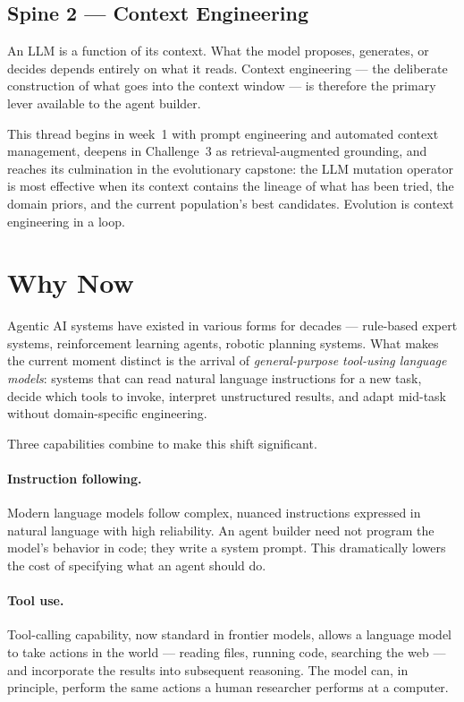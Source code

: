 \subsection{Spine 2 — Context Engineering}

An LLM is a function of its context.
What the model proposes, generates, or decides depends entirely on what it reads.
Context engineering — the deliberate construction of what goes into the context window — is therefore the primary lever available to the agent builder.

This thread begins in week~1 with prompt engineering and automated context management, deepens in Challenge~3 as retrieval-augmented grounding, and reaches its culmination in the evolutionary capstone: the LLM mutation operator is most effective when its context contains the lineage of what has been tried, the domain priors, and the current population's best candidates.
Evolution is context engineering in a loop.

\section{Why Now}

Agentic AI systems have existed in various forms for decades — rule-based expert systems, reinforcement learning agents, robotic planning systems.
What makes the current moment distinct is the arrival of \emph{general-purpose tool-using language models}: systems that can read natural language instructions for a new task, decide which tools to invoke, interpret unstructured results, and adapt mid-task without domain-specific engineering.

Three capabilities combine to make this shift significant.

\paragraph{Instruction following.}
Modern language models follow complex, nuanced instructions expressed in natural language with high reliability.
An agent builder need not program the model's behavior in code; they write a system prompt.
This dramatically lowers the cost of specifying what an agent should do.

\paragraph{Tool use.}
Tool-calling capability, now standard in frontier models, allows a language model to take actions in the world — reading files, running code, searching the web — and incorporate the results into subsequent reasoning.
The model can, in principle, perform the same actions a human researcher performs at a computer.

